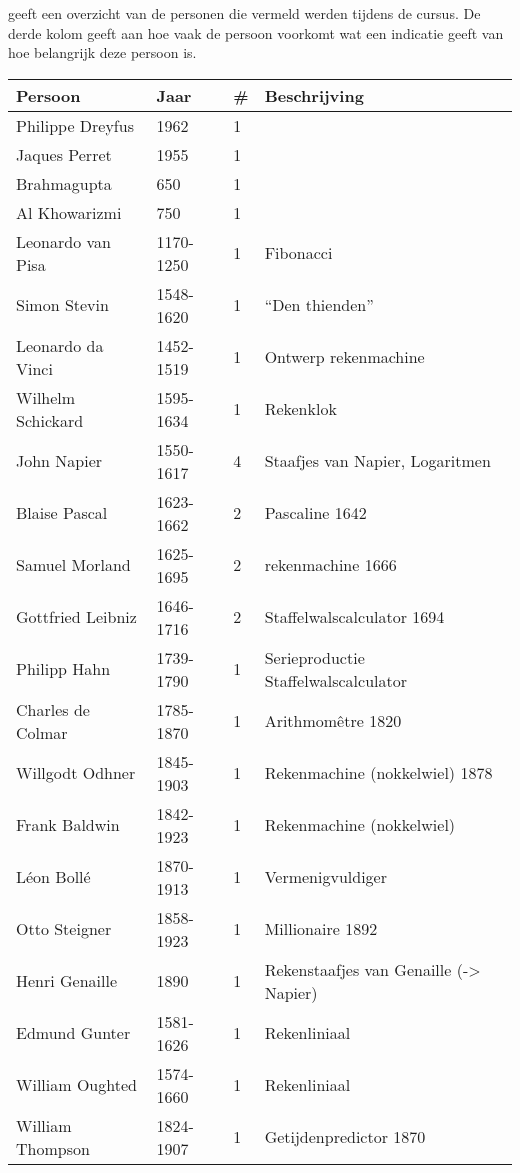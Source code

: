 \documentclass[../main.tex]{subfiles}
\begin{document}
 geeft een overzicht van de personen die vermeld werden tijdens de cursus. De derde kolom geeft aan hoe vaak de persoon voorkomt wat een indicatie geeft van hoe belangrijk deze persoon is.

\begin{longtable}{llll}
\label{table:personen}\\
\toprule
Persoon	& Jaar	& \#	& Beschrijving \\
\midrule
\endhead
\bottomrule
\endfoot
\bottomrule
\endlastfoot
Philippe Dreyfus		&	1962		&	1		&	\\
Jaques Perret			&	1955		&	1		&	\\
Brahmagupta				&	650			&	1		&	\\
Al Khowarizmi			&	750			&	1		&	\\
Leonardo van Pisa		&	1170-1250	&	1		&	Fibonacci	\\
Simon Stevin			&	1548-1620	&	1		&	``Den thienden''	\\
Leonardo da Vinci		&	1452-1519	&	1		&	Ontwerp rekenmachine	\\
Wilhelm Schickard		&	1595-1634	&	1		&	Rekenklok	\\
John Napier				&	1550-1617	&	4		&	Staafjes van Napier, Logaritmen	\\
Blaise Pascal			&	1623-1662	&	2		&	Pascaline 1642	\\
Samuel Morland			&	1625-1695	&	2		&	rekenmachine 1666	\\
Gottfried Leibniz		&	1646-1716	&	2		&	Staffelwalscalculator 1694	\\
Philipp Hahn			&	1739-1790	&	1		&	Serieproductie Staffelwalscalculator	\\
Charles de Colmar		&	1785-1870	&	1		&	Arithmomêtre 1820	\\
Willgodt Odhner			&	1845-1903	&	1		&	Rekenmachine (nokkelwiel) 1878	\\
Frank Baldwin			&	1842-1923	&	1		&	Rekenmachine (nokkelwiel)	\\
Léon Bollé				&	1870-1913	&	1		&	Vermenigvuldiger	\\
Otto Steigner			&	1858-1923	&	1		&	Millionaire 1892	\\
Henri Genaille			&	1890		&	1		&	Rekenstaafjes van Genaille (-> Napier)	\\
Edmund Gunter			&	1581-1626	&	1		&	Rekenliniaal	\\
William Oughted			&	1574-1660	&	1		&	Rekenliniaal	\\
William Thompson		&	1824-1907	&	1		&	Getijdenpredictor 1870	\\

\end{longtable}
\end{document}

